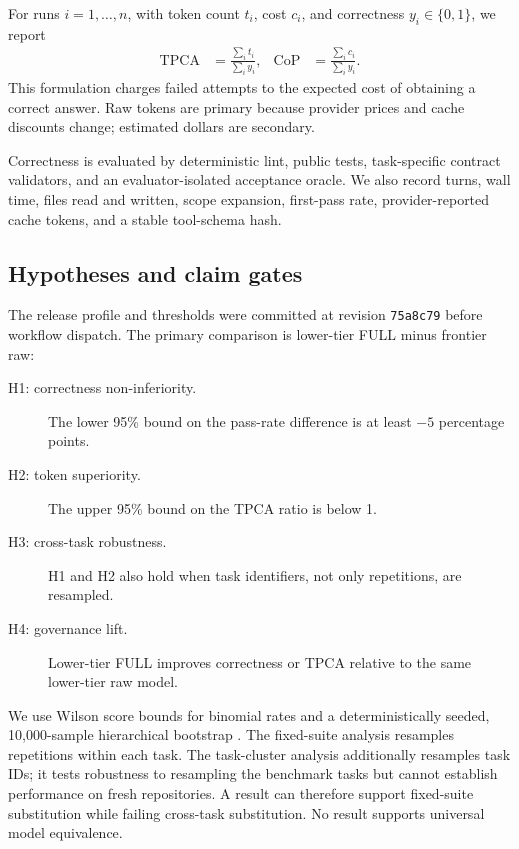 \documentclass[10pt,twocolumn]{article}
\newcommand{\tpca}{\mathrm{TPCA}}
\newcommand{\cop}{\mathrm{CoP}}
\begin{document}
For runs $i=1,\ldots,n$, with token count $t_i$, cost $c_i$, and correctness
$y_i\in\{0,1\}$, we report
\begin{align}
\tpca &= \frac{\sum_i t_i}{\sum_i y_i}, &
\cop &= \frac{\sum_i c_i}{\sum_i y_i}.
\end{align}
This formulation charges failed attempts to the expected cost of obtaining a
correct answer. Raw tokens are primary because provider prices and cache
discounts change; estimated dollars are secondary.

Correctness is evaluated by deterministic lint, public tests, task-specific
contract validators, and an evaluator-isolated acceptance oracle. We also
record turns, wall time, files read and written, scope expansion, first-pass
rate, provider-reported cache tokens, and a stable tool-schema hash.

\subsection{Hypotheses and claim gates}

The release profile and thresholds were committed at revision
\texttt{75a8c79} before workflow dispatch. The primary comparison is
lower-tier FULL minus frontier raw:
\begin{description}
  \item[H1: correctness non-inferiority.] The lower 95\% bound on the pass-rate
        difference is at least $-5$ percentage points.
  \item[H2: token superiority.] The upper 95\% bound on the TPCA ratio is below
        1.
  \item[H3: cross-task robustness.] H1 and H2 also hold when task identifiers,
        not only repetitions, are resampled.
  \item[H4: governance lift.] Lower-tier FULL improves correctness or TPCA
        relative to the same lower-tier raw model.
\end{description}

We use Wilson score bounds for binomial rates \citep{wilson1927probable} and a
deterministically seeded, 10,000-sample hierarchical bootstrap
\citep{efron1979bootstrap}. The fixed-suite analysis resamples repetitions
within each task. The task-cluster analysis additionally resamples task IDs;
it tests robustness to resampling the benchmark tasks but cannot establish
performance on fresh repositories. A result can therefore support fixed-suite
substitution while failing cross-task substitution. No result supports
universal model equivalence.
\end{document}
